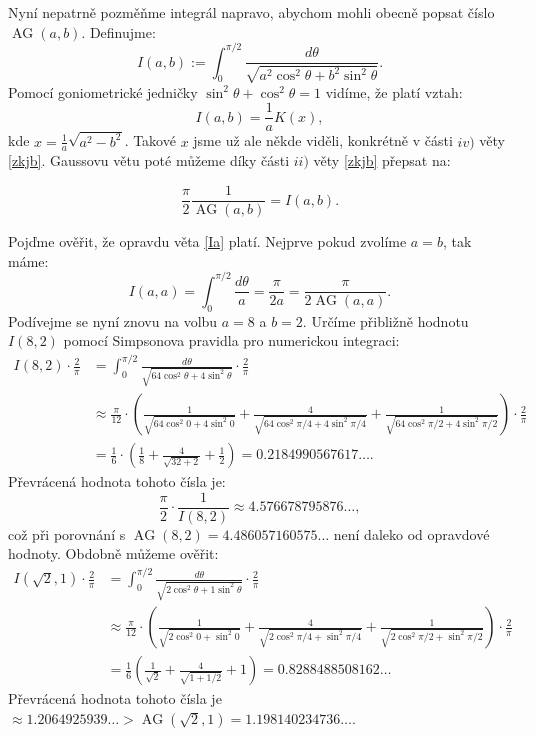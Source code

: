 \documentclass[12pt]{report}
\DeclareMathOperator{\AG}{AG}
\begin{document}
Nyní nepatrně pozměňme integrál napravo, abychom mohli obecně popsat číslo $\AG(a,b)$. Definujme:
$$I(a,b) := \int_{0}^{\pi/2} \frac{d \theta}{\sqrt{a^2 \cos ^2 \theta + b^2 \sin ^2 \theta}}. $$
Pomocí goniometrické jedničky $\sin^2 \theta + \cos^2 \theta = 1$ vidíme, že platí vztah:
$$I(a,b) = \frac{1}{a} K(x),$$ kde $x =\frac{1}{a} \sqrt{a^2-b^2}$. Takové $x$ jsme už ale někde viděli, konkrétně v části $iv)$ věty \ref{zkjb}. Gaussovu větu poté můžeme díky části $ii)$ věty \ref{zkjb} přepsat na:
\begin{veta}\label{Ia}
$$\frac{\pi}{2} \frac{1}{\AG(a,b)} = I(a,b).$$
\end{veta}


\begin{priklad}
Pojďme ověřit, že opravdu věta \ref{Ia} platí. Nejprve pokud zvolíme $a=b$, tak máme:
$$I(a,a) = \int_{0}^{\pi/2} \frac{d \theta}{a} = \frac{\pi}{2 a} = \frac{\pi}{2 \AG(a,a)}.$$
Podívejme se nyní znovu na volbu $a= 8$ a $b=2$. Určíme přibližně hodnotu $I(8,2)$ pomocí Simpsonova pravidla pro numerickou integraci:
\begin{align*}
I(8,2) \cdot \frac{2}{\pi} &= \int_{0}^{\pi/2} \frac{d \theta}{\sqrt{64 \cos ^2 \theta + 4 \sin ^2 \theta}} \cdot \frac{2}{\pi}\\
&\approx \frac{\pi}{12} \cdot \left( \frac{1}{\sqrt{64 \cos ^2 0 + 4 \sin ^2 0}} + \frac{4}{\sqrt{64 \cos ^2 \pi/4 + 4 \sin ^2 \pi/4}} + \frac{1}{\sqrt{64 \cos ^2 \pi/2 + 4 \sin ^2 \pi/2}} \right) \cdot \frac{2}{\pi}\\
&= \frac{1}{6} \cdot \left( \frac{1}{8} +\frac{4}{\sqrt{32+2}} + \frac{1}{2}  \right) = 0.2184990567617\dots.
\end{align*}
Převrácená hodnota tohoto čísla je:
$$\frac{\pi}{2} \cdot \frac{1}{I(8,2)} \approx 4.576678795876\dots,$$
což při porovnání s $\AG(8,2) = 4.486057160575\dots$ není daleko od opravdové hodnoty. Obdobně můžeme ověřit: 
\begin{align*}
I\left(\sqrt{2},1\right) \cdot \frac{2}{\pi} &= \int_{0}^{\pi/2} \frac{d \theta}{\sqrt{ 2 \cos ^2 \theta + 1 \sin ^2 \theta}} \cdot \frac{2}{\pi}\\
&\approx \frac{\pi}{12} \cdot \left( \frac{1}{\sqrt{2 \cos ^2 0 + \sin ^2 0}} + \frac{4}{\sqrt{ 2 \cos ^2 \pi/4 + \sin ^2 \pi/4}} + \frac{1}{\sqrt{ 2 \cos ^2 \pi/2 +  \sin ^2 \pi/2}} \right) \cdot \frac{2}{\pi}\\
&= \frac{1}{6} \left(\frac{1}{\sqrt{2}} + \frac{4}{\sqrt{1+1/2}} + 1  \right) = 0.8288488508162\dots
\end{align*}
Převrácená hodnota tohoto čísla je $\approx 1.2064925939\dots > \AG(\sqrt{2},1) = 1.198140234736\dots$.
\end{priklad}
\end{document}

